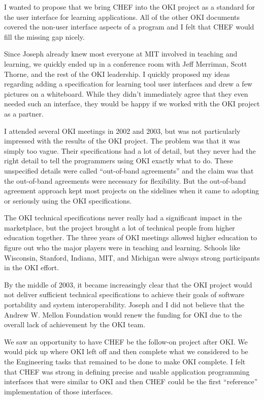 \documentclass[12pt]{book}
\begin{document}
I wanted to propose that we bring CHEF into the OKI project as a standard
for the user interface for learning applications.  All of the other OKI
documents covered the non-user interface aspects of a program and I felt
that CHEF would fill the missing gap nicely.

Since Joseph already knew most everyone at MIT involved in teaching and learning,
we quickly ended up in a conference room with Jeff Merriman, Scott Thorne, and
the rest of the OKI leadership.  I quickly proposed my ideas regarding adding a
specification for learning tool user interfaces and drew a few pictures on
a whiteboard.  While they didn't immediately agree that they even needed such
an interface, they would be happy if we worked with the OKI project as a partner.

I attended several OKI meetings in 2002 and 2003, but was not particularly impressed
with the results of the OKI project.  The problem was that it was simply
too vague.  Their specifications had a lot of detail, but they never had the right
detail to tell the programmers using OKI exactly what to do.   These unspecified details
were called ``out-of-band agreements'' and the claim was that the out-of-band agreements
were necessary for flexibility.  But the out-of-band agreement approach kept most projects
on the sidelines when it came to adopting or seriously using the OKI specifications.

The OKI technical specifications never really had a significant impact
in the marketplace, but the project brought a lot of technical people from higher
education together.  The three years of OKI meetings allowed higher education to figure out
who the major players were in teaching and learning.  Schools like
Wisconsin, Stanford, Indiana, MIT, and Michigan were always strong participants in the OKI
effort.

By the middle of 2003, it became increasingly clear that the OKI project would
not deliver sufficient technical specifications to achieve their goals of software portability
and system interoperability.  Joseph and I did not believe that the
Andrew W. Mellon Foundation would
renew the funding for OKI due to the overall lack of achievement by the OKI team.

We saw an opportunity to have CHEF be the follow-on project after OKI.   We would pick up
where OKI left off and then complete what we considered to be the Engineering tasks that
remained to be done to make OKI complete.   I felt that CHEF was strong in defining
precise and usable application programming interfaces that were similar to OKI
and then CHEF could be the first ``reference'' implementation of those interfaces.
\end{document}
